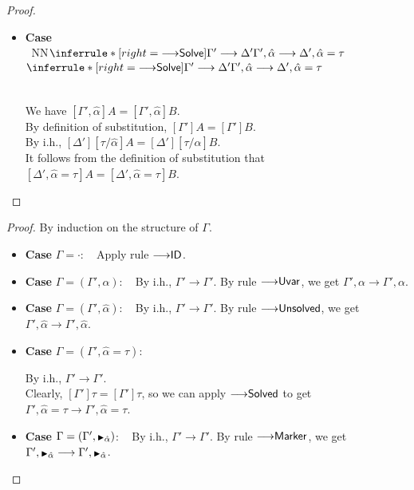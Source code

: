 \documentclass[a4paper]{article}
\newcommand{\smallblacktriangle}{\text{\textscale{0.7}{$\blacktriangleright$}}}
\newcommand{\MonnierCommaSym}{{\smallblacktriangle}}
\newcommand{\MonnierComma}[1]{{\MonnierCommaSym}_{#1}}
\newcommand{\ProofCaseRule}[1]{\item \textbf{Case }\textrm{{#1}}: ~ }
\gdef\xxDerivationProofCaseColor{N}
\newcommand{\DerivationProofCase}[3]{\smallskip
     \item \parbox[t]{100ex}{\textbf{Case } \\[-0.5em]
       $~$\hspace{5ex}
       \if\xxDerivationProofCaseColor N\ensuremath{\Infer{#1}{#2}{#3}}
       \else \colorbox{\xxDerivationProofCaseColor}{\ensuremath{\Infer{#1}{#2}{#3}}}\fi }\nopagebreak \\[-0.8ex]
  }
\newcommand{\Infer}[3]{\inferrule*[right={\text{\strut#1}}]{{}#2\mathstrut}{{}#3\mathstrut}}
\newcommand{\hypeq}[2]{{#1} = {#2}}
\newcommand{\extendssym}{\longrightarrow}
\newcommand{\extends}[2]{{#1} \extendssym {#2}}
\newcommand{\substextend}[2]{\extends{#1}{#2}}
\newcommand{\ahat}{\hat{\alpha}}
\newcommand{\rulename}[1]{\text{\normalfont\textsf{#1}}}
\newcommand{\substextendrulename}[1]{\ensuremath{{\extendssym}{\rulename{#1}}}\xspace}
\newcommand{\substextendId}{\substextendrulename{ID}}
\newcommand{\substextendUU}{\substextendrulename{Uvar}}
\newcommand{\substextendEE}{\substextendrulename{Unsolved}}
\newcommand{\substextendSolSol}{\substextendrulename{Solved}}
\newcommand{\substextendMonMon}{\substextendrulename{Marker}}
\newcommand{\substextendSolve}{\substextendrulename{Solve}}
\begin{document}
\begin{proof}
\begin{itemize}
      \DerivationProofCase{\substextendSolve}
            { \substextend{\Gamma'}{\Delta'} }
            { \substextend{\Gamma', \ahat}{\Delta', \hypeq{\ahat}{\tau}} }

          We have $[\Gamma', \ahat]A = [\Gamma', \ahat]B$. \\
          By definition of substitution, $[\Gamma']A = [\Gamma']B$. \\
          By i.h., $[\Delta'][\tau/\ahat]A = [\Delta'][\tau/\ahat]B$. \\
          It follows from the definition of substitution that
          $[\Delta', \hypeq{\ahat}{\tau}]A = [\Delta', \hypeq{\ahat}{\tau}]B$. 
    \qedhere
    \end{itemize}
\end{proof}


\substextendreflexivity*
\begin{proof}
  By induction on the structure of $\Gamma$. 

    \begin{itemize}
        \ProofCaseRule{$\Gamma = \cdot$} 
            Apply rule \substextendId. 

        \ProofCaseRule{$\Gamma = (\Gamma', \alpha)$}
            By i.h., $\substextend{\Gamma'}{\Gamma'}$.
            By rule \substextendUU, we get $\substextend{\Gamma', \alpha}{\Gamma', \alpha}$. 

        \ProofCaseRule{$\Gamma = (\Gamma', \ahat)$}
            By i.h., $\substextend{\Gamma'}{\Gamma'}$.
            By rule \substextendEE, we get $\substextend{\Gamma', \ahat}{\Gamma', \ahat}$. 

        \ProofCaseRule{$\Gamma = (\Gamma', \ahat=\tau)$}

            By i.h., $\substextend{\Gamma'}{\Gamma'}$. \\
            Clearly, $[\Gamma']\tau = [\Gamma']\tau$, so
            we can apply \substextendSolSol to get $\substextend{\Gamma', \ahat=\tau}{\Gamma', \ahat=\tau}$. 

        \ProofCaseRule{$\Gamma = (\Gamma', \MonnierComma{\ahat})$}
            By i.h., $\substextend{\Gamma'}{\Gamma'}$.
            By rule \substextendMonMon, we get $\substextend{\Gamma', \MonnierComma{\ahat}}{\Gamma', \MonnierComma{\ahat}}$.
\qedhere
    \end{itemize}
\end{proof}
\end{document}
